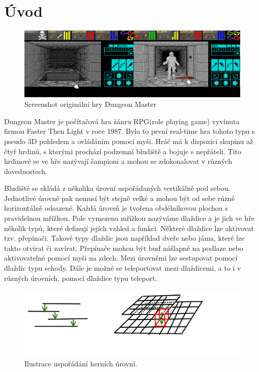 \chapter{Úvod}

\begin{figure}[ht]\centering
\includegraphics[width=\textwidth]{./img/DM-original-screen.png}
\caption{Screenshot originální hry Dungeon Master}
\label{obr0:uvod}
\end{figure}

Dungeon Master je počítačová hra žánru RPG(role playing game) vyvinuta firmou Faster Then Light v roce 1987.
Byla to první real-time hra tohoto typu s pseudo 3D pohledem a ovládáním pomocí myši. Hráč má k dispozici skupinu až čtyř hrdinů,
s kterými prochází podzemní bludiště a bojuje s nepřáteli. Tito hrdinové se ve hře nazývají šampioni a mohou se 
zdokonalovat v různých dovednostech. 

Bludiště se skládá z několika úrovní uspořádaných vertikálně pod sebou. 
Jednotlivé úrovně pak nemusí být stejně velké a mohou být od sebe různě horizontálně odsazené.
Každá úroveň je tvořena obdélníkovou plochou s pravidelnou mřížkou. Pole vymezena mřížkou nazýváme dlaždice a je jich 
ve hře několik typů, které definují jejích vzhled a funkci. Některé dlaždice lze aktivovat tzv. přepínači. Takové typy dlaždic
jsou například dveře nebo jáma, které lze takto otvírat či zavírat. Přepínače mohou být buď nášlapné na podlaze nebo aktivovatelné
pomocí myši na zdech. Mezi úrovněmi lze sestupovat pomocí dlaždic typu schody.  Dále je možné se teleportovat mezi dlaždicemi, a to i v různých úrovních, pomocí dlaždice
typu teleport. 

\begin{figure}[h]\centering
\includegraphics[width=\textwidth]{./img/DM-levels.png}
\caption{Ilustrace uspořádání herních úrovní.}
\label{obr1:uvod}
\end{figure}

